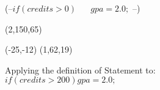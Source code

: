 




\begin {figure}

\Draw


\Text (--$if (credits > 0)$ \hfill	~~
       \hspace{20pt}$gpa = 2.0;$ \hspace{70pt}\hfill --)

\simpleBox(2,150,65)


\Move(-25,-12)
\simpleBox(1,62,19)

\EndDraw

\caption {Applying the definition of 
Statement to: \newline
$if (credits > 200) gpa = 2.0; $
}

\label {fig:ifStmt}

\end {figure}


